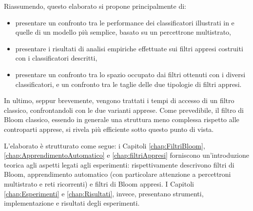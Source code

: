 \documentclass[../../main.tex]{subfiles}
\begin{document}
    Riassumendo, questo elaborato si propone principalmente di: 
    \begin{itemize}
        \item presentare un confronto tra le performance dei classificatori illustrati in \cite{ma2020} e quelle di un modello più semplice, basato su un percettrone multistrato,
        \item presentare i risultati di analisi empiriche effettuate sui filtri appresi costruiti con i classificatori descritti,
        \item presentare un confronto tra lo spazio occupato dai filtri ottenuti con i diversi classificatori, e un confronto tra le taglie delle due tipologie di filtri appresi.
    \end{itemize}
    In ultimo, seppur brevemente, vengono trattati i tempi di accesso di un filtro classico, confrontandoli con le due varianti apprese. Come prevedibile, il filtro di Bloom classico, essendo in generale una struttura meno complessa rispetto alle controparti apprese, si rivela più efficiente sotto questo punto di vista. 

    L'elaborato è strutturato come segue: i Capitoli \ref{chap:FiltriBloom}, \ref{chap:ApprendimentoAutomatico} e \ref{chap:filtriAppresi} forniscono un'introduzione teorica agli aspetti legati agli esperimenti: rispettivamente descrivono filtri di Bloom, apprendimento automatico (con particolare attenzione a percettroni multistrato e reti ricorrenti) e filtri di Bloom appresi. I Capitoli \ref{chap:Esperimenti} e \ref{chap:Risultati}, invece, presentano strumenti, implementazione e risultati degli esperimenti. 
\end{document}
